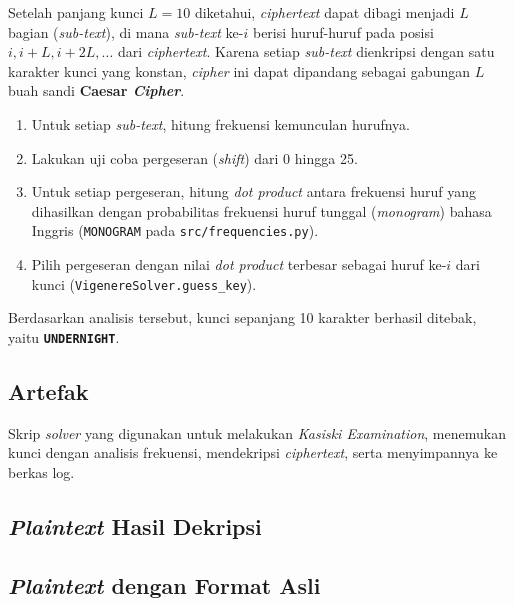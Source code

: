 Setelah panjang kunci $L=10$ diketahui, \textit{ciphertext} dapat dibagi menjadi $L$ bagian (\textit{sub-text}), di mana \textit{sub-text} ke-$i$ berisi huruf-huruf pada posisi $i, i+L, i+2L, \dots$ dari \textit{ciphertext}. Karena setiap \textit{sub-text} dienkripsi dengan satu karakter kunci yang konstan, \textit{cipher} ini dapat dipandang sebagai gabungan $L$ buah sandi \textbf{Caesar \textit{Cipher}}.

\begin{enumerate}
  \item Untuk setiap \textit{sub-text}, hitung frekuensi kemunculan hurufnya.
  \item Lakukan uji coba pergeseran (\textit{shift}) dari 0 hingga 25.
  \item Untuk setiap pergeseran, hitung \textit{dot product} antara frekuensi huruf yang dihasilkan dengan probabilitas frekuensi huruf tunggal (\textit{monogram}) bahasa Inggris (\texttt{MONOGRAM} pada \texttt{src/frequencies.py}).
  \item Pilih pergeseran dengan nilai \textit{dot product} terbesar sebagai huruf ke-$i$ dari kunci (\texttt{VigenereSolver.guess\_key}).
\end{enumerate}

Berdasarkan analisis tersebut, kunci sepanjang 10 karakter berhasil ditebak, yaitu \textbf{\texttt{UNDERNIGHT}}.

\subsection*{Artefak}

Skrip \textit{solver} yang digunakan untuk melakukan \textit{Kasiski Examination}, menemukan kunci dengan analisis frekuensi, mendekripsi \textit{ciphertext}, serta menyimpannya ke berkas log.



\subsection*{\textit{Plaintext} Hasil Dekripsi}


\subsection*{\textit{Plaintext} dengan Format Asli}

